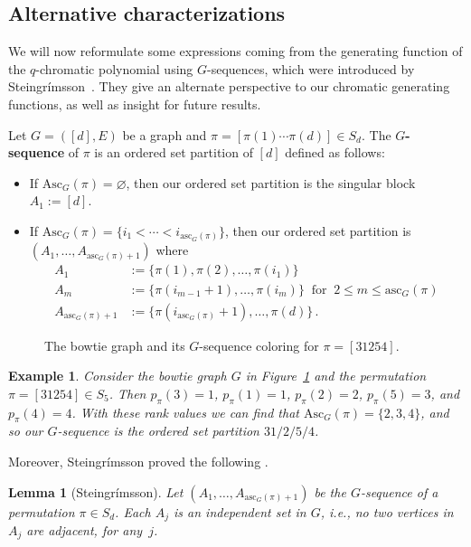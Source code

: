 \documentclass[11pt]{amsart}
\newtheorem{lemma}[theorem]{Lemma}
\newtheorem{exam}{Example}
\newenvironment{example}{\begin{exam}\sf}{\end{exam}}
\renewcommand\emptyset{\varnothing}
\newcommand\Def[1]{{\bf #1}}
\newcommand{\rk}[1][\pi]{p_{#1}}
\newcommand{\asc}{\mathrm{Asc}}
\newcommand{\ascnum}{\mathrm{asc}}
\begin{document}
\subsection{Alternative characterizations}
We will now reformulate some expressions coming from the generating function of the $q$-chromatic polynomial
using $G$-sequences, which were introduced by Steingrímsson~\cite{steingrimssoncoloring}. They give an alternate
perspective to our chromatic generating functions, as well as insight for future results.

Let $G=([d],E)$ be a graph and $\pi = [\pi(1) \cdots \pi(d)] \in S_d$. 
The \Def{$G$-sequence} of $\pi$ is an ordered set partition of $[d]$ defined as follows:
\begin{itemize}
    \item If $\asc_G(\pi) = \emptyset$, then our ordered set partition is the singular block $A_1 := [d]$.
    \item If $\asc_G(\pi) =\{i_1 < \cdots < i_{\ascnum_G(\pi)} \}$, then our ordered set partition is $(A_1, \ldots, A_{\ascnum_G(\pi)+1})$
    where
\begin{align*}
        A_1 &:= \{\pi(1), \pi(2),\ldots,\pi(i_1)\} \\
        A_m &:= \{\pi(i_{m-1} +1), \ldots, \pi(i_{m}) \} \ \text{ for } \ 2 \le m \le \ascnum_G(\pi) \\
        A_{\ascnum_G(\pi)+1} &:= \{\pi(i_{\ascnum_G(\pi)} +1),\ldots, \pi(d)\} \, .
\end{align*}
\end{itemize}

\begin{figure}
    \centering
    
    \caption{The bowtie graph and its $G$-sequence coloring for $\pi=[31254]$.}
    \label{fig:gsequence}
\end{figure}

\begin{example}\label{ex:gsequence}
    Consider the bowtie graph $G$ in Figure~\ref{fig:gsequence} and the permutation $\pi = [31254] \in S_5$. Then  $\rk(3) = 1$, $\rk(1)=1$, $\rk(2)=2$, $\rk(5)=3$, and $\rk(4)=4$. With these rank values we can find that $\asc_G(\pi) = \{ 2,3,4\}$, and so our $G$-sequence is the ordered set partition $31/2/5/4$.
\end{example}

Moreover, Steingrímsson proved the following \cite[Lemma~4]{steingrimssoncoloring}.

\begin{lemma}[Steingrímsson]\label{lem:independentgsequence}
    Let $(A_1,\ldots, A_{\ascnum_G(\pi)+1})$ be the $G$-sequence of a permutation $\pi \in S_d$. 
    Each $A_j$ is an independent set in $G$, i.e., no two vertices in $A_j$ are adjacent, for any~$j$.
\end{lemma}
\end{document}
